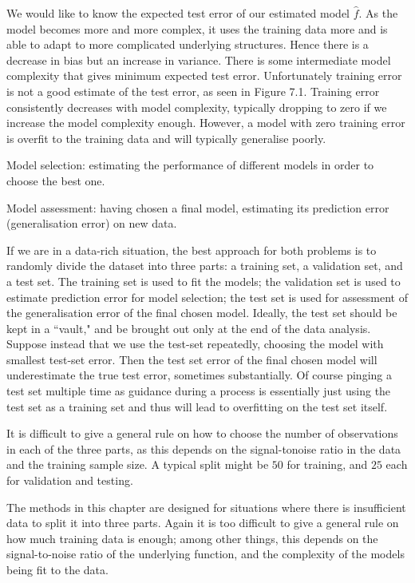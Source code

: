 We would like to know the expected test error of our estimated model $\hat{f}$. As the model becomes more and more complex, it uses the training data more and is able to adapt to more complicated underlying structures. Hence there is a decrease in bias but an increase in variance. There is some intermediate model complexity that gives minimum expected test error. Unfortunately training error is not a good estimate of the test error, as seen in Figure 7.1. Training error consistently decreases with model complexity, typically dropping to zero if we increase the model complexity enough. However, a model with zero training error is overfit to the training data and will typically generalise poorly.

Model selection: estimating the performance of different models in order to choose the best one.

Model assessment: having chosen a final model, estimating its prediction error (generalisation error) on new data.

If we are in a data-rich situation, the best approach for both problems is to randomly divide the dataset into three parts: a training set, a validation set, and a test set. The training set is used to fit the models; the validation set is used to estimate prediction error for model selection; the test set is used for assessment of the generalisation error of the final chosen model. Ideally, the test set should be kept in a ``vault," and be brought out only at the end of the data analysis. Suppose instead that we use the test-set repeatedly, choosing the model with smallest test-set error. Then the test set error of the final chosen model will underestimate the true test error, sometimes substantially. Of course pinging a test set multiple time as guidance during a process is essentially just using the test set as a training set and thus will lead to overfitting on the test set itself.

It is difficult to give a general rule on how to choose the number of
observations in each of the three parts, as this depends on the signal-tonoise ratio in the data and the training sample size. A typical split might be $50$ for training, and $25$ each for validation and testing.

The methods in this chapter are designed for situations where there is insufficient data to split it into three parts. Again it is too difficult to give a general rule on how much training data is enough; among other things, this depends on the signal-to-noise ratio of the underlying function, and the complexity of the models being fit to the data.

